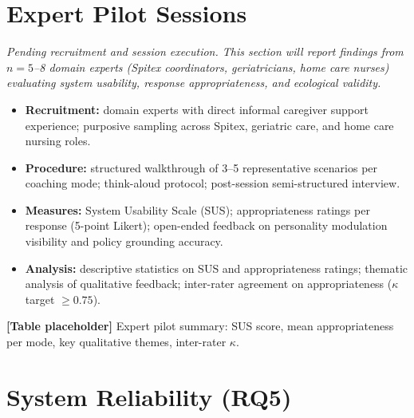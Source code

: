 \documentclass[10pt,a4paper]{report}
\begin{document}
\section{Expert Pilot Sessions}

\begin{tcolorbox}[colback=yellow!8!white, colframe=orange!70!black, title=\textbf{Placeholder --- Expert Pilot Sessions}, fonttitle=\bfseries, left=4pt, right=4pt, top=4pt, bottom=4pt]
\textit{Pending recruitment and session execution. This section will report findings from $n = 5$--8 domain experts (Spitex coordinators, geriatricians, home care nurses) evaluating system usability, response appropriateness, and ecological validity.}

\begin{itemize}[leftmargin=*, nosep]
  \item \textbf{Recruitment:} domain experts with direct informal caregiver support experience; purposive sampling across Spitex, geriatric care, and home care nursing roles.
  \item \textbf{Procedure:} structured walkthrough of 3--5 representative scenarios per coaching mode; think-aloud protocol; post-session semi-structured interview.
  \item \textbf{Measures:} System Usability Scale (SUS); appropriateness ratings per response (5-point Likert); open-ended feedback on personality modulation visibility and policy grounding accuracy.
  \item \textbf{Analysis:} descriptive statistics on SUS and appropriateness ratings; thematic analysis of qualitative feedback; inter-rater agreement on appropriateness ($\kappa$ target $\geq 0.75$).
\end{itemize}

\medskip
\textbf{[Table placeholder]} Expert pilot summary: SUS score, mean appropriateness per mode, key qualitative themes, inter-rater $\kappa$.
\end{tcolorbox}

\section{System Reliability (RQ5)}
\end{document}
